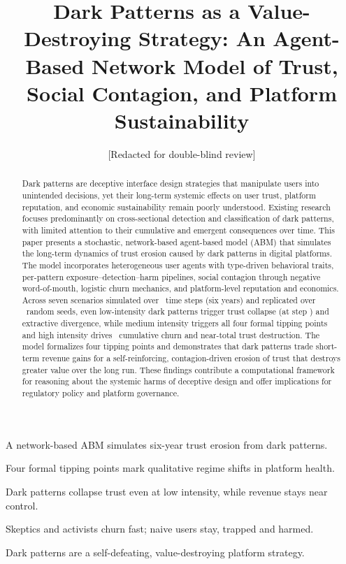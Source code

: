 \documentclass[a4paper,fleqn]{cas-sc}
\begin{document}

\title[mode=title]{Dark Patterns as a Value-Destroying Strategy: An Agent-Based Network Model of Trust, Social Contagion, and Platform Sustainability}

\author[1]{[Redacted for double-blind review]}
\cormark[1]

\begin{abstract}
Dark patterns are deceptive interface design strategies that manipulate users into unintended decisions, yet their long-term systemic effects on user trust, platform reputation, and economic sustainability remain poorly understood. Existing research focuses predominantly on cross-sectional detection and classification of dark patterns, with limited attention to their cumulative and emergent consequences over time. This paper presents a stochastic, network-based agent-based model (ABM) that simulates the long-term dynamics of trust erosion caused by dark patterns in digital platforms. The model incorporates heterogeneous user agents with type-driven behavioral traits, per-pattern exposure--detection--harm pipelines, social contagion through negative word-of-mouth, logistic churn mechanics, and platform-level reputation and economics. Across seven scenarios simulated over \maxSteps\ time steps (six years) and replicated over \numReplicates\ random seeds, even low-intensity dark patterns trigger trust collapse (at step \lowCollapseStep) and extractive divergence, while medium intensity triggers all four formal tipping points and high intensity drives \highChurn\ cumulative churn and near-total trust destruction. The model formalizes four tipping points and demonstrates that dark patterns trade short-term revenue gains for a self-reinforcing, contagion-driven erosion of trust that destroys greater value over the long run. These findings contribute a computational framework for reasoning about the systemic harms of deceptive design and offer implications for regulatory policy and platform governance.
\end{abstract}

\begin{highlights}
\item A network-based ABM simulates six-year trust erosion from dark patterns.
\item Four formal tipping points mark qualitative regime shifts in platform health.
\item Dark patterns collapse trust even at low intensity, while revenue stays near control.
\item Skeptics and activists churn fast; naive users stay, trapped and harmed.
\item Dark patterns are a self-defeating, value-destroying platform strategy.
\end{highlights}
\end{document}
